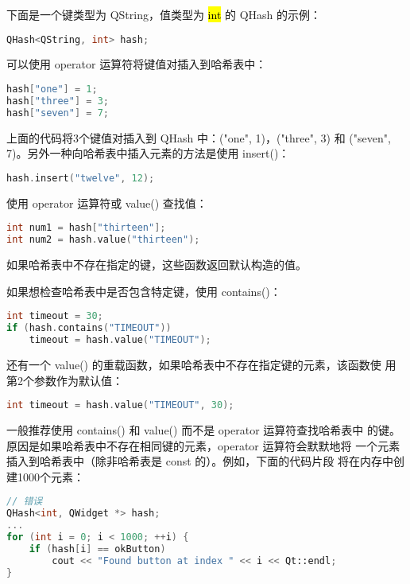 下面是一个键类型为 QString，值类型为 \hl{int} 的 QHash 的示例：

\begin{lstlisting}[language=C++]
QHash<QString, int> hash;
\end{lstlisting}


可以使用 operator 运算符将键值对插入到哈希表中：

\begin{lstlisting}[language=C++]
hash["one"] = 1;
hash["three"] = 3;
hash["seven"] = 7;
\end{lstlisting}

上面的代码将3个键值对插入到 QHash 中：("one", 1)，("three", 3) 和
("seven", 7)。另外一种向哈希表中插入元素的方法是使用 insert()：

\begin{lstlisting}[language=C++]
hash.insert("twelve", 12);
\end{lstlisting}

使用 operator 运算符或 value() 查找值：

\begin{lstlisting}[language=C++]
int num1 = hash["thirteen"];
int num2 = hash.value("thirteen");
\end{lstlisting}

如果哈希表中不存在指定的键，这些函数返回默认构造的值。

如果想检查哈希表中是否包含特定键，使用 contains()：

\begin{lstlisting}[language=C++]
int timeout = 30;
if (hash.contains("TIMEOUT"))
    timeout = hash.value("TIMEOUT");
\end{lstlisting}

还有一个 value() 的重载函数，如果哈希表中不存在指定键的元素，该函数使
用第2个参数作为默认值：

\begin{lstlisting}[language=C++]
int timeout = hash.value("TIMEOUT", 30);
\end{lstlisting}

一般推荐使用 contains() 和 value() 而不是 operator 运算符查找哈希表中
的键。原因是如果哈希表中不存在相同键的元素，operator 运算符会默默地将
一个元素插入到哈希表中（除非哈希表是 const 的）。例如，下面的代码片段
将在内存中创建1000个元素：


\begin{lstlisting}[language=C++]
// 错误
QHash<int, QWidget *> hash;
...
for (int i = 0; i < 1000; ++i) {
    if (hash[i] == okButton)
        cout << "Found button at index " << i << Qt::endl;
}
\end{lstlisting}

